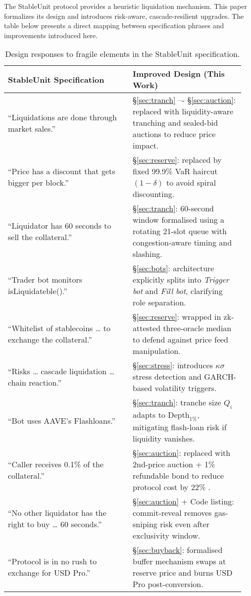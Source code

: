 \documentclass[11pt]{article}
\newcommand{\secref}[1]{\hyperref[#1]{\S\ref*{#1}}}
\begin{document}
The StableUnit protocol \parencite{stableunit2025spec} provides a heuristic liquidation mechanism. This paper formalizes its design and introduces risk-aware, cascade-resilient upgrades. The table below presents a direct mapping between specification phrases and improvements introduced here.
\begin{table}[ht]
\centering
\caption{Design responses to fragile elements in the StableUnit specification.}
\label{tab:trigger-map}

\begin{tabular}{@{}p{0.5\linewidth} p{0.45\linewidth}@{}}
\toprule
\textbf{StableUnit Specification} & \textbf{Improved Design (This Work)} \\
\midrule
“Liquidations are done through market sales.” & \secref{sec:tranch} –- \secref{sec:auction}: replaced with liquidity-aware tranching and sealed-bid auctions to reduce price impact. \\
“Price has a discount that gets bigger per block.” & \secref{sec:reserve}: replaced by fixed 99.9\% VaR haircut $(1 - \delta)$ to avoid spiral discounting. \\
“Liquidator has 60 seconds to sell the collateral.” & \secref{sec:tranch}: 60-second window formalised using a rotating 21-slot queue with congestion-aware timing and slashing. \\
“Trader bot monitors isLiquidateble().” & \secref{sec:bots}: architecture explicitly splits into \textit{Trigger bot} and \textit{Fill bot}, clarifying role separation. \\
“Whitelist of stablecoins … to exchange the collateral.” & \secref{sec:reserve}: wrapped in zk-attested three-oracle median to defend against price feed manipulation. \\
“Risks … cascade liquidation … chain reaction.” & \secref{sec:stress}: introduces $\kappa\sigma$ stress detection and GARCH-based volatility triggers. \\
“Bot uses AAVE’s Flashloans.” & \secref{sec:tranch}: tranche size $Q_i$ adapts to $\text{Depth}_{1\%}$, mitigating flash-loan risk if liquidity vanishes. \\
“Caller receives 0.1\% of the collateral.” & \secref{sec:auction}: replaced with 2nd-price auction + 1\% refundable bond to reduce protocol cost by 22\% \parencite{tian2025defi}. \\
“No other liquidator has the right to buy … 60 seconds.” & \secref{sec:auction} + Code listing: commit-reveal removes gas-sniping risk even after exclusivity window. \\
“Protocol is in no rush to exchange for USD Pro.” &  \secref{sec:buyback}: formalised buffer mechanism swaps at reserve price and burns USD Pro post-conversion. \\
\bottomrule
\end{tabular}
\end{table}
\end{document}
